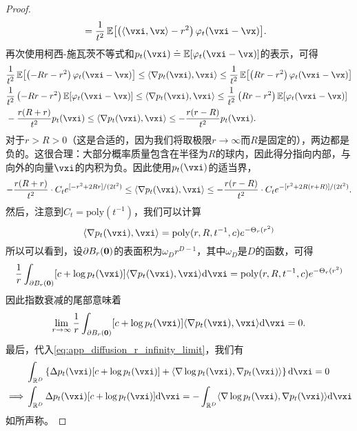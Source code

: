 \documentclass[../../book-main_zh.tex]{subfiles}
\begin{document}
\begin{proof}
\begin{align}
        &= \frac{1}{t^{2}}\Ex\rs{\bp{\ip{\vxi}{\vx} - r^{2}}\phi_{t}(\vxi - \vx)}.
    \end{align}
    再次使用柯西-施瓦茨不等式和\(p_{t}(\vxi) \doteq \Ex[\phi_{t}(\vxi - \vx)]\)的表示，可得
    \begin{align}
        &\frac{1}{t^{2}}\Ex\rs{\bp{-Rr - r^{2}}\phi_{t}(\vxi - \vx)} \leq \ip{\nabla p_{t}(\vxi)}{\vxi} \leq \frac{1}{t^{2}}\Ex\rs{\bp{Rr - r^{2}}\phi_{t}(\vxi - \vx)} \\
        &\frac{1}{t^{2}}\bp{-Rr - r^{2}}\Ex\rs{\phi_{t}(\vxi - \vx)} \leq \ip{\nabla p_{t}(\vxi)}{\vxi} \leq \frac{1}{t^{2}}\bp{Rr - r^{2}}\Ex\rs{\phi_{t}(\vxi - \vx)} \\
        &-\frac{r(R + r)}{t^{2}}p_{t}(\vxi) \leq \ip{\nabla p_{t}(\vxi)}{\vxi} \leq -\frac{r(r - R)}{t^{2}}p_{t}(\vxi).
    \end{align}
    对于\(r > R > 0\)（这是合适的，因为我们将取极限\(r \to \infty\)而\(R\)是固定的），两边都是负的。这很合理：大部分概率质量包含在半径为\(R\)的球内，因此得分指向内部，与向外的向量\(\vxi\)的内积为负。因此使用\(p_{t}(\vxi)\)的适当界，
    \begin{equation}
        -\frac{r(R + r)}{t^{2}}\cdot C_{t}e^{[-r^{2} + 2Rr]/(2t^{2})} \leq \ip{\nabla p_{t}(\vxi)}{\vxi} \leq -\frac{r(r - R)}{t^{2}}\cdot C_{t}e^{-[r^{2} + 2R(r + R)]/(2t^{2})}.
    \end{equation}
    然后，注意到\(C_{t} = \mathrm{poly}(t^{-1})\)，我们可以计算
    \begin{equation}
        [c + \log p_{t}(\vxi)]\ip{\nabla p_{t}(\vxi)}{\vxi} = \mathrm{poly}(r, R, t^{-1}, c)e^{-\Theta_{r}(r^{2})}
    \end{equation}
    所以可以看到，设\(\partial B_{r}(\bm{0})\)的表面积为\(\omega_{D} r^{D - 1}\)，其中\(\omega_{D}\)是\(D\)的函数，可得
    \begin{equation}
        \frac{1}{r}\int_{\partial B_{r}(\vzero)}[c + \log p_{t}(\vxi)]\ip{\nabla p_{t}(\vxi)}{\vxi}\odif{\vxi} = \mathrm{poly}(r, R, t^{-1}, c)e^{-\Theta_{r}(r^{2})}
    \end{equation}
    因此指数衰减的尾部意味着
    \begin{equation}
        \lim_{r \to \infty}\frac{1}{r}\int_{\partial B_{r}(\vzero)}[c + \log p_{t}(\vxi)]\ip{\nabla p_{t}(\vxi)}{\vxi}\odif{\vxi} = 0.
    \end{equation}
    最后，代入\eqref{eq:app_diffusion_r_infinity_limit}，我们有
    \begin{align}
        &\int_{\R^{D}}\bc{\Delta p_{t}(\vxi)[c + \log p_{t}(\vxi)] + \ip{\nabla \log p_{t}(\vxi)}{\nabla p_{t}(\vxi)}}\odif{\vxi} = 0 \\
        \implies 
        &\int_{\R^{D}}\Delta p_{t}(\vxi)[c + \log p_{t}(\vxi)]\odif{\vxi} = -\int_{\R^{D}}\ip{\nabla \log p_{t}(\vxi)}{\nabla p_{t}(\vxi)}\odif{\vxi}
    \end{align}
    如所声称。
\end{proof}
\end{document}
